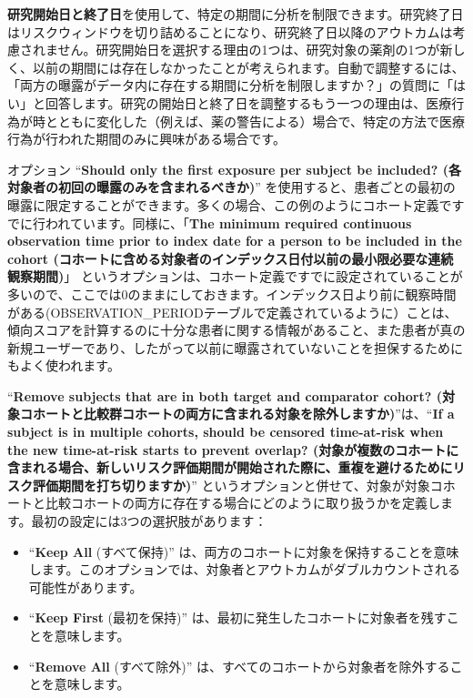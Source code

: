 \documentclass[
  11pt]{book}
\theoremstyle{definition}
\theoremstyle{definition}
\theoremstyle{definition}
\theoremstyle{definition}
\theoremstyle{remark}
\begin{document}
\textbf{研究開始日と終了日}を使用して、特定の期間に分析を制限できます。研究終了日はリスクウィンドウを切り詰めることになり、研究終了日以降のアウトカムは考慮されません。研究開始日を選択する理由の1つは、研究対象の薬剤の1つが新しく、以前の期間には存在しなかったことが考えられます。自動で調整するには、「両方の曝露がデータ内に存在する期間に分析を制限しますか？」の質問に「はい」と回答します。研究の開始日と終了日を調整するもう一つの理由は、医療行為が時とともに変化した（例えば、薬の警告による）場合で、特定の方法で医療行為が行われた期間のみに興味がある場合です。

オプション ``\textbf{Should only the first exposure per subject be included? (各対象者の初回の曝露のみを含まれるべきか)}'' を使用すると、患者ごとの最初の曝露に限定することができます。多くの場合、この例のようにコホート定義ですでに行われています。同様に、「\textbf{The minimum required continuous observation time prior to index date for a person to be included in the cohort (コホートに含める対象者のインデックス日付以前の最小限必要な連続観察期間)}」 というオプションは、コホート定義ですでに設定されていることが多いので、ここでは0のままにしておきます。インデックス日より前に観察時間がある(OBSERVATION\_PERIODテーブルで定義されているように）ことは、傾向スコアを計算するのに十分な患者に関する情報があること、また患者が真の新規ユーザーであり、したがって以前に曝露されていないことを担保するためにもよく使われます。

``\textbf{Remove subjects that are in both target and comparator cohort? (対象コホートと比較群コホートの両方に含まれる対象を除外しますか)}''は、``\textbf{If a subject is in multiple cohorts, should be censored time-at-risk when the new time-at-risk starts to prevent overlap? (対象が複数のコホートに含まれる場合、新しいリスク評価期間が開始された際に、重複を避けるためにリスク評価期間を打ち切りますか)}'' というオプションと併せて、対象が対象コホートと比較コホートの両方に存在する場合にどのように取り扱うかを定義します。最初の設定には3つの選択肢があります：

\begin{itemize}
\item
  ``\textbf{Keep All} (すべて保持)'' は、両方のコホートに対象を保持することを意味します。このオプションでは、対象者とアウトカムがダブルカウントされる可能性があります。
\item
  ``\textbf{Keep First} (最初を保持)'' は、最初に発生したコホートに対象者を残すことを意味します。
\item
  ``\textbf{Remove All} (すべて除外)'' は、すべてのコホートから対象者を除外することを意味します。
\end{itemize}
\end{document}
